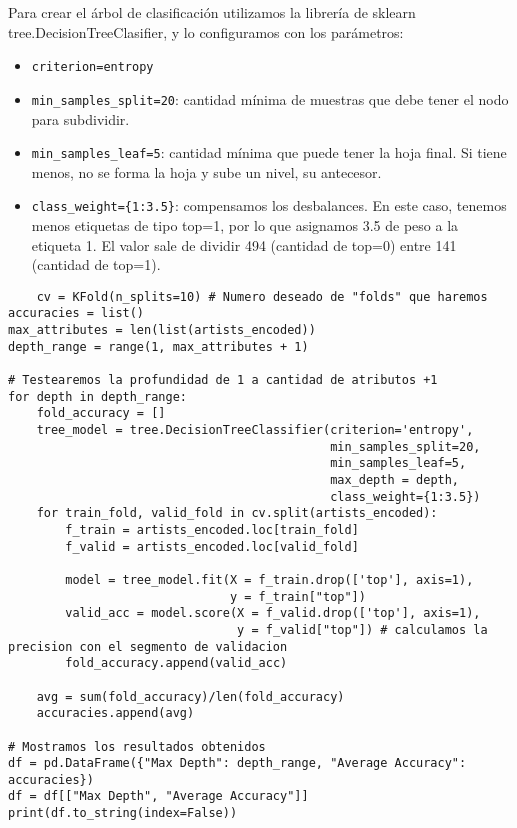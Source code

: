 \documentclass{article}
\begin{document}
Para crear el árbol  de clasificación utilizamos la librería de sklearn tree.DecisionTreeClasifier, y lo configuramos con los parámetros:

\begin{center}
    \begin{itemize}
        \item \texttt{criterion=entropy}
        \item \texttt{min\_samples\_split=20}: cantidad mínima de muestras que debe tener el nodo para subdividir.
        \item \texttt{min\_samples\_leaf=5}: cantidad mínima que puede tener la hoja final. Si tiene menos, no se forma la hoja y sube un nivel, su antecesor.
        \item \texttt{class\_weight=\{1:3.5\}}: compensamos los desbalances. En este caso, tenemos menos etiquetas de tipo top=1, por lo que asignamos 3.5 de peso a la etiqueta 1. El valor sale de dividir 494 (cantidad de top=0) entre 141 (cantidad de top=1).
    \end{itemize}
\end{center}


\begin{lstlisting}
    cv = KFold(n_splits=10) # Numero deseado de "folds" que haremos
accuracies = list()
max_attributes = len(list(artists_encoded))
depth_range = range(1, max_attributes + 1)

# Testearemos la profundidad de 1 a cantidad de atributos +1
for depth in depth_range:
    fold_accuracy = []
    tree_model = tree.DecisionTreeClassifier(criterion='entropy',
                                             min_samples_split=20,
                                             min_samples_leaf=5,
                                             max_depth = depth,
                                             class_weight={1:3.5})
    for train_fold, valid_fold in cv.split(artists_encoded):
        f_train = artists_encoded.loc[train_fold] 
        f_valid = artists_encoded.loc[valid_fold] 

        model = tree_model.fit(X = f_train.drop(['top'], axis=1), 
                               y = f_train["top"]) 
        valid_acc = model.score(X = f_valid.drop(['top'], axis=1), 
                                y = f_valid["top"]) # calculamos la precision con el segmento de validacion
        fold_accuracy.append(valid_acc)

    avg = sum(fold_accuracy)/len(fold_accuracy)
    accuracies.append(avg)
    
# Mostramos los resultados obtenidos
df = pd.DataFrame({"Max Depth": depth_range, "Average Accuracy": accuracies})
df = df[["Max Depth", "Average Accuracy"]]
print(df.to_string(index=False))
\end{lstlisting}
\end{document}

